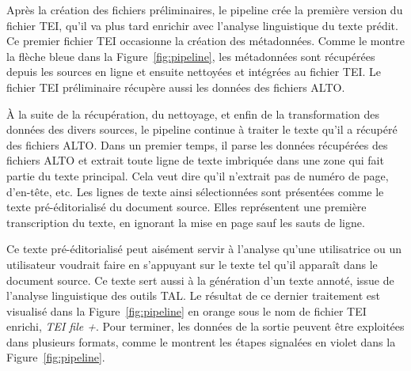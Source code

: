 \documentclass[class=article, crop=false]{standalone}
\begin{document}
Après la création des fichiers préliminaires, le pipeline crée la première version du fichier \acrshort{TEI}, qu'il va plus tard enrichir avec l'analyse linguistique du texte prédit. Ce premier fichier \acrshort{TEI} occasionne la création des métadonnées. Comme le montre la flèche bleue dans la Figure~\ref{fig:pipeline}, les métadonnées sont récupérées depuis les sources en ligne et ensuite nettoyées et intégrées au fichier \acrshort{TEI}. Le fichier \acrshort{TEI} préliminaire récupère aussi les données des fichiers \acrshort{ALTO}.

À la suite de la récupération, du nettoyage, et enfin de la transformation des données des divers sources, le pipeline continue à traiter le texte qu'il a récupéré des fichiers \acrshort{ALTO}. Dans un premier temps, il parse les données récupérées des fichiers \acrshort{ALTO} et extrait toute ligne de texte imbriquée dans une zone qui fait partie du texte principal. Cela veut dire qu'il n'extrait pas de numéro de page, d'en-tête, etc. Les lignes de texte ainsi sélectionnées sont présentées comme le texte pré-éditorialisé du document source. Elles représentent une première transcription du texte, en ignorant la mise en page sauf les sauts de ligne.

Ce texte pré-éditorialisé peut aisément servir à l'analyse qu'une utilisatrice ou un utilisateur voudrait faire en s'appuyant sur le texte tel qu'il apparaît dans le document source. Ce texte sert aussi à la génération d'un texte annoté, issue de l'analyse linguistique des outils \acrshort{TAL}. Le résultat de ce dernier traitement est visualisé dans la Figure~\ref{fig:pipeline} en orange sous le nom de fichier \acrshort{TEI} enrichi, \textit{TEI file +}. Pour terminer, les données de la sortie peuvent être exploitées dans plusieurs formats, comme le montrent les étapes signalées en violet dans la Figure~\ref{fig:pipeline}.
\end{document}

